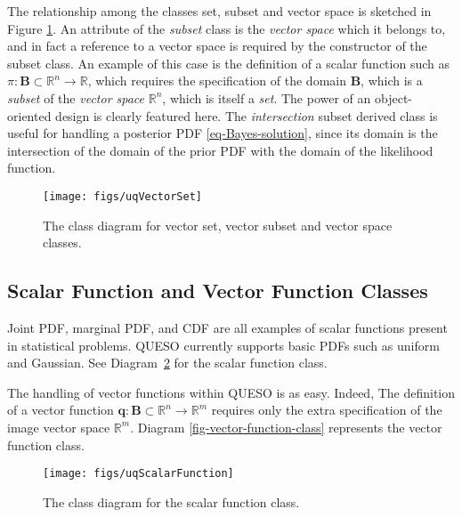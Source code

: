 The relationship among the classes set, subset and vector space is sketched in Figure \ref{fig-vector-space-subset-classes}.
%
An attribute of the {\it subset} class is the {\it vector space} which it belongs to, and in fact a reference to a vector space is required by the constructor of the subset class. An example of this case is the definition of a scalar function such as $\pi:\mathbf{B}\subset\mathbb{R}^n\rightarrow\mathbb{R}$, which requires the specification of the domain $\mathbf{B}$, which is a {\it subset} of the {\it vector space} $\mathbb{R}^n$, which is itself a {\it set}.
The power of an object-oriented design is clearly featured here.
The {\it intersection} subset derived class is useful for handling a posterior PDF \eqref{eq-Bayes-solution},
since its domain is the intersection of the domain of the prior PDF with the domain of the likelihood function.

\begin{figure}[hp]
\centering
\texttt{[image: figs/uqVectorSet]}
\vspace*{-8pt}
\caption{The class diagram for vector set, vector subset and vector space classes.}
\label{fig-vector-space-subset-classes}
\end{figure}

\subsection{Scalar Function and Vector Function Classes}\label{sec:scalar-vector-function}

Joint PDF, marginal PDF, and CDF are all examples of scalar functions present in statistical problems. 
QUESO currently supports basic PDFs such as uniform and Gaussian.
See Diagram~\ref{fig-scalar-function-class} for the scalar function class.

The handling of vector functions within QUESO is as easy. Indeed,
The definition of a vector function $\mathbf{q}:\mathbf{B}\subset\mathbb{R}^n\rightarrow\mathbb{R}^m$ requires only the extra specification of the image vector space $\mathbb{R}^m$. Diagram \ref{fig-vector-function-class} represents the vector function class.
\begin{figure}[htpb]
\centering
\texttt{[image: figs/uqScalarFunction]}
\vspace{-8pt}
\caption{The class diagram for the scalar function class.}
\label{fig-scalar-function-class}
\end{figure}

